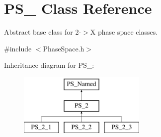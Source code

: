 \hypertarget{classPS__2}{}\section{P\+S\+\_ Class Reference}
\label{classPS__2}


Abstract base class for 2-\/$>$X phase space classes.  




{\ttfamily \#include $<$Phase\+Space.\+h$>$}

Inheritance diagram for P\+S\+\_\+:\begin{figure}[H]
\begin{center}
\leavevmode
\includegraphics[height=3.000000cm]{classPS__2}
\end{center}
\end{figure}
